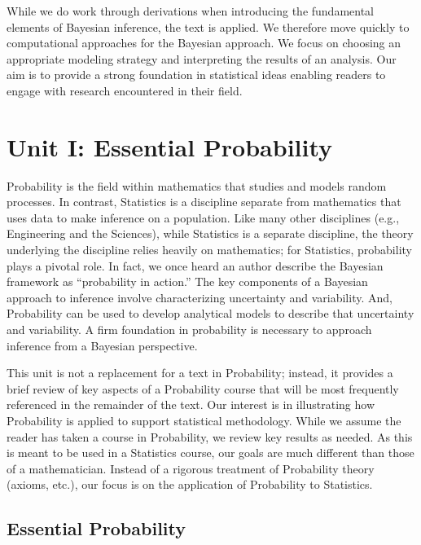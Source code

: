 \documentclass[
  letterpaper,
  DIV=11,
  numbers=noendperiod]{scrreprt}
\theoremstyle{definition}
\theoremstyle{definition}
\theoremstyle{plain}
\theoremstyle{remark}
\begin{document}
While we do work through derivations when introducing the fundamental
elements of Bayesian inference, the text is applied. We therefore move
quickly to computational approaches for the Bayesian approach. We focus
on choosing an appropriate modeling strategy and interpreting the
results of an analysis. Our aim is to provide a strong foundation in
statistical ideas enabling readers to engage with research encountered
in their field.

\part{Unit I: Essential Probability}

Probability is the field within mathematics that studies and models
random processes. In contrast, Statistics is a discipline separate from
mathematics that uses data to make inference on a population. Like many
other disciplines (e.g., Engineering and the Sciences), while Statistics
is a separate discipline, the theory underlying the discipline relies
heavily on mathematics; for Statistics, probability plays a pivotal
role. In fact, we once heard an author describe the Bayesian framework
as ``probability in action.'' The key components of a Bayesian approach
to inference involve characterizing uncertainty and variability. And,
Probability can be used to develop analytical models to describe that
uncertainty and variability. A firm foundation in probability is
necessary to approach inference from a Bayesian perspective.

This unit is not a replacement for a text in Probability; instead, it
provides a brief review of key aspects of a Probability course that will
be most frequently referenced in the remainder of the text. Our interest
is in illustrating how Probability is applied to support statistical
methodology. While we assume the reader has taken a course in
Probability, we review key results as needed. As this is meant to be
used in a Statistics course, our goals are much different than those of
a mathematician. Instead of a rigorous treatment of Probability theory
(axioms, etc.), our focus is on the application of Probability to
Statistics.

\hypertarget{sec-fundamentals}{%
\chapter{Essential Probability}\label{sec-fundamentals}}

\providecommand{\norm}[1]{\lVert#1\rVert}
\providecommand{\abs}[1]{\lvert#1\rvert}
\providecommand{\iid}{\stackrel{\text{IID}}{\sim}}
\providecommand{\ind}{\stackrel{\text{Ind}}{\sim}}
\end{document}
